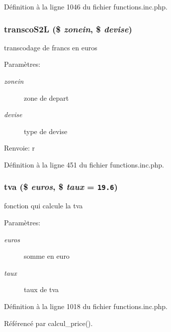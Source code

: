 D\'{e}finition \`{a} la ligne 1046 du fichier functions.inc.php.\hypertarget{functions_8inc_8php_a25}{
\subsubsection[transcoS2L]{\setlength{\rightskip}{0pt plus 5cm}transco\-S2L (\$ {\em zonein}, \$ {\em devise})}}
\label{functions_8inc_8php_a25}


transcodage de francs en euros 

\begin{Desc}
\item[Param\`{e}tres:]
\begin{description}
\item[{\em zonein}]zone de depart \item[{\em devise}]type de devise \end{description}
\end{Desc}
\begin{Desc}
\item[Renvoie:]r \end{Desc}


D\'{e}finition \`{a} la ligne 451 du fichier functions.inc.php.\hypertarget{functions_8inc_8php_a40}{
\subsubsection[tva]{\setlength{\rightskip}{0pt plus 5cm}tva (\$ {\em euros}, \$ {\em taux} = {\tt 19.6})}}
\label{functions_8inc_8php_a40}


fonction qui calcule la tva 

\begin{Desc}
\item[Param\`{e}tres:]
\begin{description}
\item[{\em euros}]somme en euro \item[{\em taux}]taux de tva \end{description}
\end{Desc}


D\'{e}finition \`{a} la ligne 1018 du fichier functions.inc.php.

R\'{e}f\'{e}renc\'{e} par calcul\_\-price().